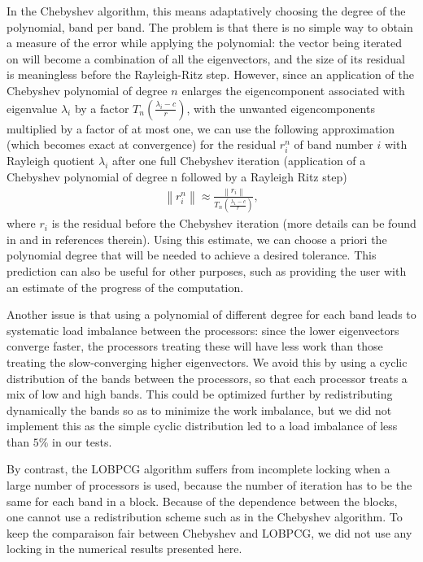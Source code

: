 \documentclass[11pt]{elsarticle}
\newcommand{\norm}[1]{\left\lVert#1\right\rVert}
\begin{document}
In the Chebyshev algorithm, this means adaptatively choosing the
degree of the polynomial, band per band. The problem is that there is
no simple way to obtain a measure of the error while applying the
polynomial: the vector being iterated on will become a combination of
all the eigenvectors, and the size of its residual is meaningless
before the Rayleigh-Ritz step. However, since an application of the
Chebyshev polynomial of degree $n$ enlarges the eigencomponent
associated with eigenvalue $\lambda_i$ by a factor
$T_{n}(\frac{\lambda_{i} - c}r)$, with the unwanted eigencomponents
multiplied by a factor of at most one, we can use the following
approximation (which becomes exact at convergence) for the residual
$r_i^n$ of band number $i$ with Rayleigh quotient $\lambda_i$ after
one full Chebyshev iteration (application of a Chebyshev polynomial of
degree n followed by a Rayleigh Ritz step)
\begin{align}
  \norm{r_{i}^n} \approx \frac{\norm{r_{i}}}{T_{n}(\frac{\lambda_{1} - c}r)},
\end{align}
where $r_i$ is the residual before the Chebyshev iteration (more
details can be found in \cite{saad1992numerical} and in references
therein). Using this estimate, we can choose a priori the polynomial
degree that will be needed to achieve a desired tolerance. This
prediction can also be useful for other purposes, such as providing
the user with an estimate of the progress of the computation.

Another issue is that using a polynomial of different degree for each
band leads to systematic load imbalance between the processors: since
the lower eigenvectors converge faster, the processors treating these
will have less work than those treating the slow-converging higher
eigenvectors. We avoid this by using a cyclic distribution of the
bands between the processors, so that each processor treats a mix of
low and high bands. This could be optimized further by redistributing
dynamically the bands so as to minimize the work imbalance, but we did
not implement this as the simple cyclic distribution led to a load
imbalance of less than $5\%$ in our tests.

By contrast, the LOBPCG algorithm suffers from incomplete locking when
a large number of processors is used, because the number of iteration
has to be the same for each band in a block. Because of the dependence
between the blocks, one cannot use a redistribution scheme such as in
the Chebyshev algorithm. To keep the comparaison fair between
Chebyshev and LOBPCG, we did not use any locking in the numerical
results presented here.
\end{document}
